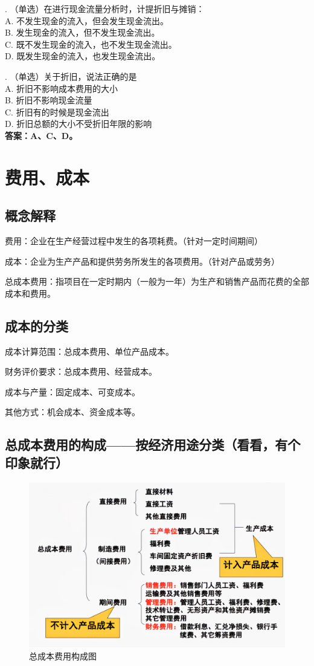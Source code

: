 . （单选）在进行现金流量分析时，计提折旧与摊销：\\
A. 不发生现金的流入，但会发生现金流出。\\
B. 发生现金的流入，但不发生现金流出。\\
C. 既不发生现金的流入，也不发生现金流出。\\
D. 既发生现金的流入，也发生现金流出。

. （单选）关于折旧，说法正确的是\\
A. 折旧不影响成本费用的大小\\
B. 折旧不影响现金流量\\
C. 折旧有的时候是现金流出\\
D. 折旧总额的大小不受折旧年限的影响\\
\textbf{答案：A、C、D。}

\section{费用、成本}
\subsection{概念解释}
费用：企业在生产经营过程中发生的各项耗费。（针对一定时间期间）

成本：企业为生产产品和提供劳务所发生的各项费用。（针对产品或劳务）

总成本费用：指项目在一定时期内（一般为一年）为生产和销售产品而花费的全部成本和费用。
\subsection{成本的分类}
成本计算范围：总成本费用、单位产品成本。

财务评价要求：总成本费用、经营成本。

成本与产量：固定成本、可变成本。

其他方式：机会成本、资金成本等。

\subsection{总成本费用的构成——按经济用途分类（看看，有个印象就行）}
\begin{figure}[H]
    \centering
    \includegraphics[width=\textwidth]{image/总成本费用构成.png}
    \caption{总成本费用构成图}
\end{figure}

